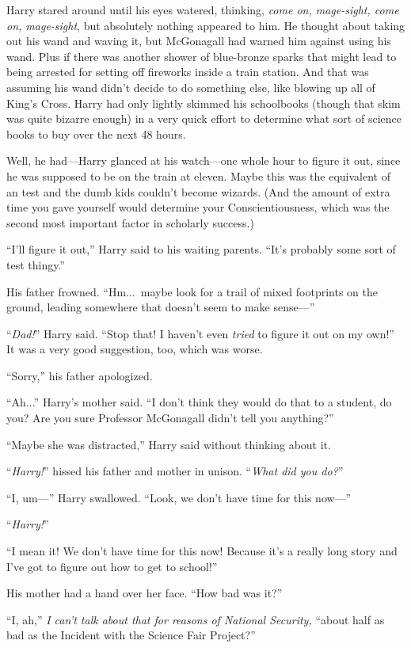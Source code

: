 Harry stared around until his eyes watered, thinking, \emph{come on, mage-sight, come on, mage-sight}, but absolutely nothing appeared to him. He thought about taking out his wand and waving it, but McGonagall had warned him against using his wand. Plus if there was another shower of blue-bronze sparks that might lead to being arrested for setting off fireworks inside a train station. And that was assuming his wand didn’t decide to do something else, like blowing up all of King’s Cross. Harry had only lightly skimmed his schoolbooks (though that skim was quite bizarre enough) in a very quick effort to determine what sort of science books to buy over the next 48 hours.

Well, he had—Harry glanced at his watch—one whole hour to figure it out, since he was supposed to be on the train at eleven. Maybe this was the equivalent of an  test and the dumb kids couldn’t become wizards. (And the amount of extra time you gave yourself would determine your Conscientiousness, which was the second most important factor in scholarly success.)

“I’ll figure it out,” Harry said to his waiting parents. “It’s probably some sort of test thingy.”

His father frowned. “Hm...\ maybe look for a trail of mixed footprints on the ground, leading somewhere that doesn’t seem to make sense—”

“\emph{Dad!}” Harry said. “Stop that! I haven’t even \emph{tried} to figure it out on my own!” It was a very good suggestion, too, which was worse.

“Sorry,” his father apologized.

“Ah...” Harry’s mother said. “I don’t think they would do that to a student, do you? Are you sure Professor McGonagall didn’t tell you anything?”

“Maybe she was distracted,” Harry said without thinking about it.

“\emph{Harry!}” hissed his father and mother in unison. “\emph{What did you do?}”

“I, um—” Harry swallowed. “Look, we don’t have time for this now—”

“\emph{Harry!}”

“I mean it! We don’t have time for this now! Because it’s a really long story and I’ve got to figure out how to get to school!”

His mother had a hand over her face. “How bad was it?”

“I, ah,” \emph{I can’t talk about that for reasons of National Security,} “about half as bad as the Incident with the Science Fair Project?”

